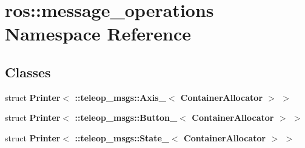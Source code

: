 \section{ros::message\_\-operations Namespace Reference}
\label{namespaceros_1_1message__operations}
\subsection*{Classes}
\begin{DoxyCompactItemize}
\item 
struct {\bf Printer$<$ ::teleop\_\-msgs::Axis\_\-$<$ ContainerAllocator $>$ $>$}
\item 
struct {\bf Printer$<$ ::teleop\_\-msgs::Button\_\-$<$ ContainerAllocator $>$ $>$}
\item 
struct {\bf Printer$<$ ::teleop\_\-msgs::State\_\-$<$ ContainerAllocator $>$ $>$}
\end{DoxyCompactItemize}
